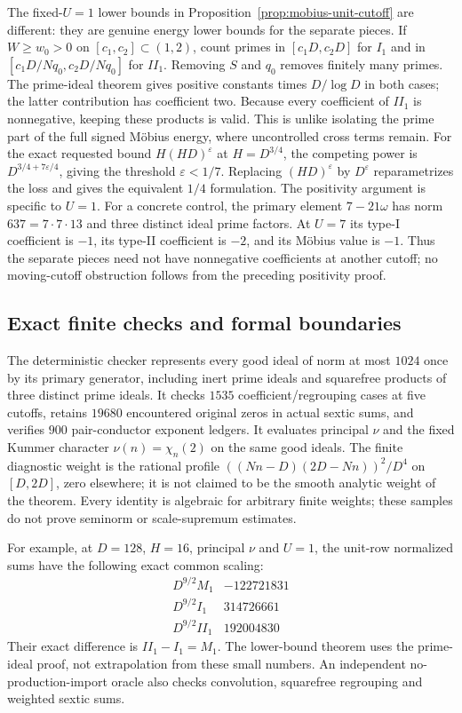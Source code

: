 The fixed-$U=1$ lower bounds in
Proposition~\ref{prop:mobius-unit-cutoff} are different: they are genuine
energy lower bounds for the separate pieces. If $W\ge w_0>0$ on
$[c_1,c_2]\subset(1,2)$, count primes in
$[c_1D,c_2D]$ for $I_1$ and in
$[c_1D/Nq_0,c_2D/Nq_0]$ for $II_1$. Removing $S$ and $q_0$ removes
finitely many primes. The prime-ideal theorem gives positive constants
times $D/\log D$ in both cases; the latter contribution has coefficient
two. Because every coefficient of $II_1$ is nonnegative, keeping these
products is valid. This is unlike isolating the prime part of the full
signed M\"obius energy, where uncontrolled cross terms remain.
For the exact requested bound $H(HD)^\varepsilon$ at $H=D^{3/4}$,
the competing power is $D^{3/4+7\varepsilon/4}$, giving the threshold
$\varepsilon<1/7$. Replacing $(HD)^\varepsilon$ by $D^\varepsilon$
reparametrizes the loss and gives the equivalent $1/4$ formulation.
The positivity argument is specific to $U=1$. For a concrete control,
the primary element $7-21\omega$ has norm $637=7\cdot7\cdot13$ and
three distinct ideal prime factors. At $U=7$ its type-I coefficient is
$-1$, its type-II coefficient is $-2$, and its M\"obius value is $-1$.
Thus the separate pieces need not have nonnegative coefficients at another
cutoff; no moving-cutoff obstruction follows from the preceding positivity
proof.

\subsection{Exact finite checks and formal boundaries}
The deterministic checker represents every good ideal of norm at most
$1024$ once by its primary generator, including inert prime ideals and
squarefree products of three distinct prime ideals.
It checks $1535$ coefficient/regrouping cases at five cutoffs, retains
$19680$ encountered original zeros in actual sextic sums, and verifies
$900$ pair-conductor exponent ledgers. It evaluates principal $\nu$ and
the fixed Kummer character $\nu(n)=\chi_n(2)$ on the same good ideals.
The finite diagnostic weight is the rational profile
$((Nn-D)(2D-Nn))^2/D^4$ on $[D,2D]$, zero elsewhere; it is not claimed
to be the smooth analytic weight of the theorem. Every identity is
algebraic for arbitrary finite weights; these samples do not prove
seminorm or scale-supremum estimates.

For example, at $D=128$, $H=16$, principal $\nu$ and $U=1$, the unit-row
normalized sums have the following exact common scaling:
\[
\begin{array}{c|r}
 D^{9/2}M_1&-122721831\\
 D^{9/2}I_1&314726661\\
 D^{9/2}II_1&192004830
\end{array}
\]
Their exact difference is $II_1-I_1=M_1$. The lower-bound theorem uses
the prime-ideal proof, not extrapolation from these small numbers.
An independent no-production-import oracle also checks convolution,
squarefree regrouping and weighted sextic sums.

